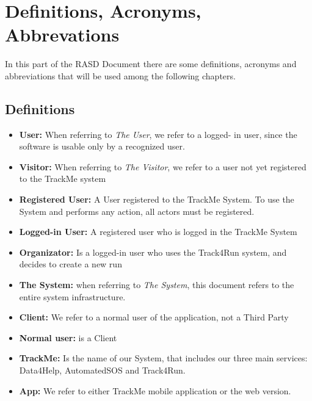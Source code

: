 \section{Definitions, Acronyms, Abbrevations}
In this part of the RASD Document there are some definitions, acronyms and abbreviations that will be used among the following chapters.
\subsection{Definitions}
\begin{itemize}
\item \textbf{User:} When referring to \emph{The User}, we refer to a logged- in user, since the software is usable only by a recognized user. 

\item \textbf{Visitor:} When referring to \emph{The Visitor}, we refer to a user not yet registered to the TrackMe system

\item \textbf{Registered User:} A User registered to the TrackMe System. To use the System and performs any action, all actors must be registered. 

\item\textbf{Logged-in User:} A registered user who is logged in the TrackMe System

\item\textbf{Organizator:} Is a logged-in  user who uses the Track4Run system, and decides to create a new run
\item \textbf{The System:} when referring to \emph{The System}, this document refers to the entire system infrastructure.

\item \textbf{Client:} We refer to a normal user of the application, not a Third Party
\item\textbf{Normal user: } is a Client

\item\textbf{TrackMe:}
Is the name of our System, that  includes our three main services: Data4Help, AutomatedSOS and Track4Run.
\item\textbf{App:} We refer to either TrackMe mobile application or the web version.


\end{itemize}
